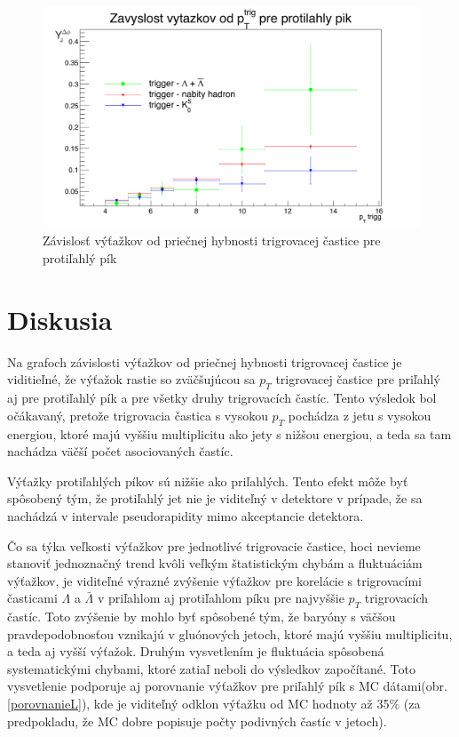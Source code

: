 \documentclass[thesismargins, thesislinespacing]{rnthesis}
\begin{document}
\begin{figure}[hbtp!]
	\centering
	\includegraphics[width=\textwidth]{./Obrazky_praca/vytazok_away.png}
	\caption{Závislosť výťažkov od priečnej hybnosti trigrovacej častice pre protiľahlý pík}
	\label{away}
\end{figure}

\chapter{Diskusia}
 
Na grafoch závislosti výťažkov od priečnej hybnosti trigrovacej častice je viditieľné, že výťažok rastie so zväčšujúcou sa $p_T$ trigrovacej častice pre priľahlý aj pre protiľahlý pík a pre všetky druhy trigrovacích častíc. Tento výsledok bol očákavaný, pretože trigrovacia častica s vysokou $p_T$ pochádza z jetu s vysokou energiou, ktoré majú vyššiu multiplicitu ako jety s nižšou energiou, a teda sa tam nachádza väčší počet asociovaných častíc. 

Výťažky protiľahlých píkov sú nižšie ako priľahlých. Tento efekt môže byť spôsobený tým, že protiľahlý jet nie je viditeľný v detektore v prípade, že sa nachádzá v intervale pseudorapidity mimo akceptancie detektora. 

Čo sa týka veľkosti výťažkov pre jednotlivé trigrovacie častice, hoci nevieme stanoviť jednoznačný trend kvôli veľkým štatistickým chybám a fluktuáciám výťažkov, je viditeľné výrazné zvýšenie výťažkov pre korelácie s trigrovacími časticami $\Lambda$ a $\bar{\Lambda}$ v priľahlom aj protiľahlom píku pre najvyššie $p_T$ trigrovacích častíc. Toto zvýšenie by mohlo byť spôsobené tým, že baryóny s väčšou pravdepodobnosťou vznikajú v gluónových jetoch, ktoré majú vyššiu multiplicitu, a teda aj vyšší výťažok. Druhým vysvetlením je fluktuácia spôsobená systematickými chybami, ktoré zatiaľ neboli do výsledkov započítané. Toto vysvetlenie podporuje aj porovnanie výťažkov pre priľahlý pík s MC dátami(obr. \ref{porovnanieL}), kde je viditeľný odklon výťažku od MC hodnoty až 35\% (za predpokladu, že MC dobre popisuje počty podivných častíc v jetoch).    
\end{document}
